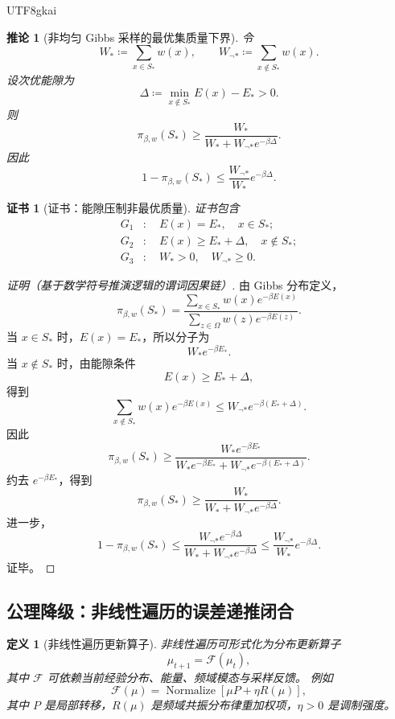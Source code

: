 \documentclass[12pt]{article}
\newtheorem{definition}{定义}[section]
\newtheorem{corollary}{推论}[section]
\newtheorem{Certificate}{证书}[section]
\newcommand{\DefEq}{\coloneqq}
\newcommand{\Normalize}{\operatorname{Normalize}}
\begin{document}
\begin{CJK*}{UTF8}{gkai}
\begin{corollary}[非均匀 Gibbs 采样的最优集质量下界]
\label{cor:tex55-gibbs-hit}
令
\[
  W_*\DefEq\sum_{x\in S_*}w(x),
  \qquad
  W_{\neg *}\DefEq\sum_{x\notin S_*}w(x).
\]
设次优能隙为
\[
  \Delta
  \DefEq
  \min_{x\notin S_*}E(x)-E_*>0.
\]
则
\[
  \pi_{\beta,w}(S_*)
  \ge
  \frac{W_*}{W_*+W_{\neg *}e^{-\beta\Delta}}.
\]
因此
\[
  1-\pi_{\beta,w}(S_*)
  \le
  \frac{W_{\neg *}}{W_*}e^{-\beta\Delta}.
\]
\end{corollary}

\begin{Certificate}[证书：能隙压制非最优质量]
\label{cert:tex55-gibbs-hit}
证书包含
\[
\begin{aligned}
  G_1&:\quad E(x)=E_*,\quad x\in S_*;\\
  G_2&:\quad E(x)\ge E_*+\Delta,\quad x\notin S_*;\\
  G_3&:\quad W_*>0,\quad W_{\neg *}\ge0.
\end{aligned}
\]
\end{Certificate}

\begin{proof}[证明（基于数学符号推演逻辑的谓词因果链）]
由 Gibbs 分布定义，
\[
  \pi_{\beta,w}(S_*)
  =
  \frac{
  \sum_{x\in S_*}w(x)e^{-\beta E(x)}
  }{
  \sum_{z\in\Omega}w(z)e^{-\beta E(z)}
  }.
\]
当 \(x\in S_*\) 时，\(E(x)=E_*\)，所以分子为
\[
  W_*e^{-\beta E_*}.
\]
当 \(x\notin S_*\) 时，由能隙条件
\[
  E(x)\ge E_*+\Delta,
\]
得到
\[
  \sum_{x\notin S_*}w(x)e^{-\beta E(x)}
  \le
  W_{\neg *}e^{-\beta(E_*+\Delta)}.
\]
因此
\[
  \pi_{\beta,w}(S_*)
  \ge
  \frac{
  W_*e^{-\beta E_*}
  }{
  W_*e^{-\beta E_*}
  +
  W_{\neg *}e^{-\beta(E_*+\Delta)}
  }.
\]
约去 \(e^{-\beta E_*}\)，得到
\[
  \pi_{\beta,w}(S_*)
  \ge
  \frac{W_*}{W_*+W_{\neg *}e^{-\beta\Delta}}.
\]
进一步，
\[
  1-\pi_{\beta,w}(S_*)
  \le
  \frac{W_{\neg *}e^{-\beta\Delta}}{W_*+W_{\neg *}e^{-\beta\Delta}}
  \le
  \frac{W_{\neg *}}{W_*}e^{-\beta\Delta}.
\]
证毕。
\end{proof}

\subsection{公理降级：非线性遍历的误差递推闭合}
\label{subsec:tex55-nonlinear-induction}

\begin{definition}[非线性遍历更新算子]
\label{def:tex55-nonlinear-update}
非线性遍历可形式化为分布更新算子
\[
  \mu_{t+1}=\mathcal F(\mu_t),
\]
其中 \(\mathcal F\) 可依赖当前经验分布、能量、频域模态与采样反馈。
例如
\[
  \mathcal F(\mu)
  =
  \Normalize\left[
  \mu P+\eta R(\mu)
  \right],
\]
其中 \(P\) 是局部转移，\(R(\mu)\) 是频域共振分布律重加权项，\(\eta>0\) 是调制强度。
\end{definition}


\end{CJK*}
\end{document}
